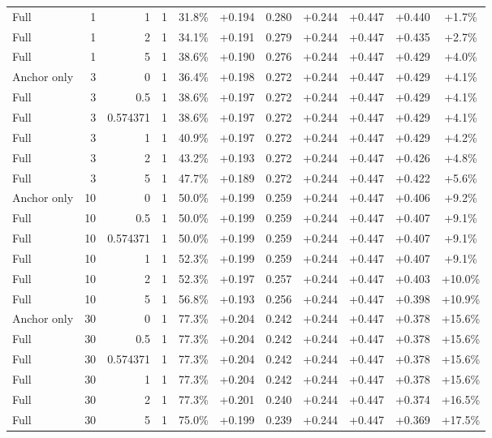 \begin{table}[htbp]
\begin{tabular}{lrrrccccccc}
Full & 1 & 1 & 1 & 31.8\% & +0.194 & 0.280 & +0.244 & +0.447 & +0.440 & +1.7\% \\
Full & 1 & 2 & 1 & 34.1\% & +0.191 & 0.279 & +0.244 & +0.447 & +0.435 & +2.7\% \\
Full & 1 & 5 & 1 & 38.6\% & +0.190 & 0.276 & +0.244 & +0.447 & +0.429 & +4.0\% \\
Anchor only & 3 & 0 & 1 & 36.4\% & +0.198 & 0.272 & +0.244 & +0.447 & +0.429 & +4.1\% \\
Full & 3 & 0.5 & 1 & 38.6\% & +0.197 & 0.272 & +0.244 & +0.447 & +0.429 & +4.1\% \\
Full & 3 & 0.574371 & 1 & 38.6\% & +0.197 & 0.272 & +0.244 & +0.447 & +0.429 & +4.1\% \\
Full & 3 & 1 & 1 & 40.9\% & +0.197 & 0.272 & +0.244 & +0.447 & +0.429 & +4.2\% \\
Full & 3 & 2 & 1 & 43.2\% & +0.193 & 0.272 & +0.244 & +0.447 & +0.426 & +4.8\% \\
Full & 3 & 5 & 1 & 47.7\% & +0.189 & 0.272 & +0.244 & +0.447 & +0.422 & +5.6\% \\
Anchor only & 10 & 0 & 1 & 50.0\% & +0.199 & 0.259 & +0.244 & +0.447 & +0.406 & +9.2\% \\
Full & 10 & 0.5 & 1 & 50.0\% & +0.199 & 0.259 & +0.244 & +0.447 & +0.407 & +9.1\% \\
Full & 10 & 0.574371 & 1 & 50.0\% & +0.199 & 0.259 & +0.244 & +0.447 & +0.407 & +9.1\% \\
Full & 10 & 1 & 1 & 52.3\% & +0.199 & 0.259 & +0.244 & +0.447 & +0.407 & +9.1\% \\
Full & 10 & 2 & 1 & 52.3\% & +0.197 & 0.257 & +0.244 & +0.447 & +0.403 & +10.0\% \\
Full & 10 & 5 & 1 & 56.8\% & +0.193 & 0.256 & +0.244 & +0.447 & +0.398 & +10.9\% \\
Anchor only & 30 & 0 & 1 & 77.3\% & +0.204 & 0.242 & +0.244 & +0.447 & +0.378 & +15.6\% \\
Full & 30 & 0.5 & 1 & 77.3\% & +0.204 & 0.242 & +0.244 & +0.447 & +0.378 & +15.6\% \\
Full & 30 & 0.574371 & 1 & 77.3\% & +0.204 & 0.242 & +0.244 & +0.447 & +0.378 & +15.6\% \\
Full & 30 & 1 & 1 & 77.3\% & +0.204 & 0.242 & +0.244 & +0.447 & +0.378 & +15.6\% \\
Full & 30 & 2 & 1 & 77.3\% & +0.201 & 0.240 & +0.244 & +0.447 & +0.374 & +16.5\% \\
Full & 30 & 5 & 1 & 75.0\% & +0.199 & 0.239 & +0.244 & +0.447 & +0.369 & +17.5\% \\

\end{tabular}
\end{table}

